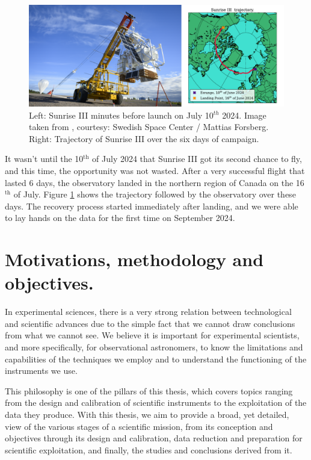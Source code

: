 \begin{figure}[t]
  \centering
  \includegraphics[width = \textwidth]{figures/Introduction/Sunrise.pdf}
  \caption[Sunrise III and its trajectory]{Left: Sunrise III minutes before launch on July 10$^{th}$ 2024. Image taken from \cite{SunriseIII}, courtesy: Swedish Space Center / Mattias Forsberg. Right: Trajectory of Sunrise III over the six days of campaign.} 
  \label{fig_intro: sunrise_trajectory}
\end{figure}

It wasn't until the 10$^{\text{th}}$ of July 2024 that Sunrise III got its second chance to fly, and this time, the opportunity was not wasted. After a very successful flight that lasted 6 days, the observatory landed in the northern region of Canada on the 16$^{\text{th}}$ of July. Figure \ref{fig_intro: sunrise_trajectory} shows the trajectory followed by the observatory over these days. The recovery process started immediately after landing, and we were able to lay hands on the data for the first time on September 2024. 

\section{Motivations, methodology and objectives.}

In experimental sciences, there is a very strong relation between technological and scientific advances due to the simple fact that we cannot draw conclusions from what we cannot see. We believe it is important for experimental scientists, and more specifically, for observational astronomers, to know the limitations and capabilities of the techniques we employ and to understand the functioning of the instruments we use. 

This philosophy is one of the pillars of this thesis, which covers topics ranging from the design and calibration of scientific instruments to the exploitation of the data they produce. With this thesis, we aim to provide a broad, yet detailed, view of the various stages of a scientific mission, from its conception and objectives through its design and calibration, data reduction and preparation for scientific exploitation, and finally, the studies and conclusions derived from it.

